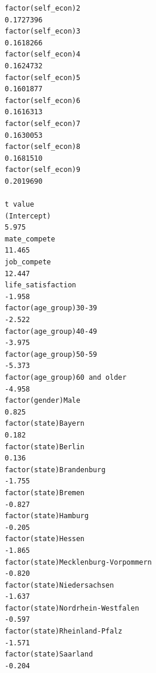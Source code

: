\documentclass[
]{article}
\begin{document}
\begin{table}
\begin{minipage}[t]{\linewidth}
{\begin{verbatim}
factor(self_econ)2                                                                 0.1727396
factor(self_econ)3                                                                 0.1618266
factor(self_econ)4                                                                 0.1624732
factor(self_econ)5                                                                 0.1601877
factor(self_econ)6                                                                 0.1616313
factor(self_econ)7                                                                 0.1630053
factor(self_econ)8                                                                 0.1681510
factor(self_econ)9                                                                 0.2019690
                                                                                  t value
(Intercept)                                                                         5.975
mate_compete                                                                       11.465
job_compete                                                                        12.447
life_satisfaction                                                                  -1.958
factor(age_group)30-39                                                             -2.522
factor(age_group)40-49                                                             -3.975
factor(age_group)50-59                                                             -5.373
factor(age_group)60 and older                                                      -4.958
factor(gender)Male                                                                  0.825
factor(state)Bayern                                                                 0.182
factor(state)Berlin                                                                 0.136
factor(state)Brandenburg                                                           -1.755
factor(state)Bremen                                                                -0.827
factor(state)Hamburg                                                               -0.205
factor(state)Hessen                                                                -1.865
factor(state)Mecklenburg-Vorpommern                                                -0.820
factor(state)Niedersachsen                                                         -1.637
factor(state)Nordrhein-Westfalen                                                   -0.597
factor(state)Rheinland-Pfalz                                                       -1.571
factor(state)Saarland                                                              -0.204

\end{verbatim}}
\end{minipage}
\end{table}
\end{document}
